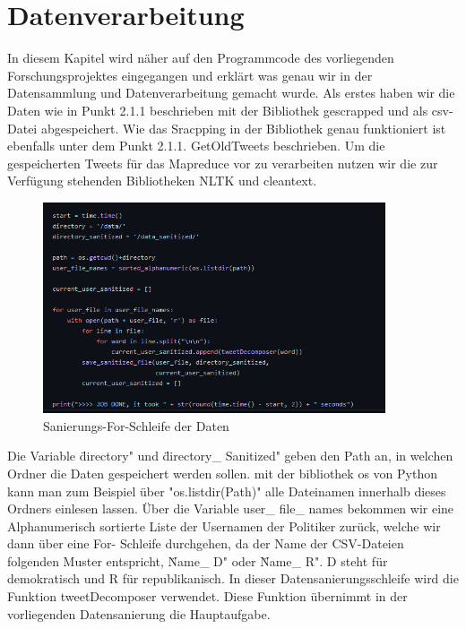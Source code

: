 \section{Datenverarbeitung}
	
	In diesem Kapitel wird näher auf den Programmcode des vorliegenden Forschungsprojektes eingegangen und erklärt was genau wir in der Datensammlung und 
	Datenverarbeitung gemacht wurde. 
	Als erstes haben wir die Daten wie in Punkt 2.1.1 beschrieben mit der Bibliothek gescrapped und als csv-Datei abgespeichert. Wie das Sracpping in der 
	Bibliothek genau funktioniert ist ebenfalls unter dem Punkt 2.1.1. GetOldTweets beschrieben. Um die gespeicherten Tweets für das Mapreduce vor zu 
	verarbeiten nutzen wir die zur Verfügung stehenden Bibliotheken NLTK und cleantext.
	
	
	\begin{figure}[ht]
		\centering
		\includegraphics[width=0.9\textwidth]{images/Kapitel2/Code_Datensanierung_1}
		\caption{\label{fig:DataSan}Sanierungs-For-Schleife der Daten}
	\end{figure}
	
	Die Variable \"directory" und \"directory\_ Sanitized" geben den Path an, in welchen Ordner die Daten gespeichert werden sollen. mit der bibliothek os von Python 
	kann man zum Beispiel über "os.listdir(Path)" alle Dateinamen innerhalb dieses Ordners einlesen lassen. 
	Über die Variable user\_ file\_ names bekommen wir eine Alphanumerisch sortierte Liste der Usernamen der Politiker zurück, welche wir dann über eine For-
	Schleife durchgehen, da der Name der CSV-Dateien folgenden Muster entspricht, \"Name\_ D" oder \"Name\_ R". D steht für demokratisch und R für 
	republikanisch. In dieser Datensanierungsschleife wird die Funktion tweetDecomposer verwendet. Diese Funktion übernimmt in der vorliegenden Datensanierung die 
	Hauptaufgabe.
	
